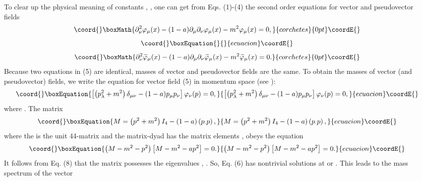 \documentclass[a4paper,12pt]{article}
\begin{document}
To clear up the physical meaning of constants \coordHE{}, \coordHE{}, one can
get from Eqs. (1)-(4) the second order equations for vector and
pseudovector fields
\[\coord{}\boxMath{
\partial _\nu^2 \varphi _{\mu }(x)-(1-a)\partial _\mu\partial _\nu
\varphi_\mu (x) -m^2\varphi _\mu(x)=0 ,
}{corchetes}{0pt}\coordE{}\]
\vspace{-8mm}
\begin{equation}\coord{}\boxEquation{  \label{5}
}{  }{ecuacion}\coordE{}\end{equation}
\vspace{-8mm}
\[\coord{}\boxMath{
\partial_\nu^2\widetilde{\varphi}_{\mu}(x)-(1-a)\partial _\mu
\partial_\nu\widetilde{\varphi}_\mu (x)-m^2\widetilde{\varphi}_\mu (x)=0 .
 }{corchetes}{0pt}\coordE{}\]
Because two equations in (5) are identical, masses of vector and
pseudovector fields are the same. To obtain the masses of vector
(and pseudovector) fields, we write the equation for vector field
(5) in momentum space (see \cite{Kruglov2}):
\begin{equation}\coord{}\boxEquation{
 \left[\left(p_\lambda^2+m^2\right)\delta_{\mu\nu}-(1-a)p_\mu p_\nu
\right]\varphi_\nu (p)=0 , \label{6}
}{
 \left[\left(p_\lambda^2+m^2\right)\delta_{\mu\nu}-(1-a)p_\mu p_\nu
\right]\varphi_\nu (p)=0 , }{ecuacion}\coordE{}\end{equation}
where \coordHE{}. The
matrix
\begin{equation}\coord{}\boxEquation{
M=\left( p^2+m^2 \right) I_4-(1-a) \left( p_{\cdot }p\right),
\label{7}
}{
M=\left( p^2+m^2 \right) I_4-(1-a) \left( p_{\cdot }p\right),
}{ecuacion}\coordE{}\end{equation}
where the \coordHE{} is the unit 4\myHighlight{$\times $}\coordHE{}4-matrix and the matrix-dyad
\coordHE{} has the matrix elements \coordHE{}, obeys the equation
\begin{equation}\coord{}\boxEquation{
\left(M-m^2 -p^2\right) \left[ M-m^2 -ap^2 \right] =0 . \label{8}
}{
\left(M-m^2 -p^2\right) \left[ M-m^2 -ap^2 \right] =0 . }{ecuacion}\coordE{}\end{equation}
It follows from Eq. (8) that the matrix \coordHE{} possesses the
eigenvalues \coordHE{} , \coordHE{}. So,
Eq. (6) has nontrivial solutions at \coordHE{} or \coordHE{}. This leads to the mass spectrum of the vector
\end{document}
